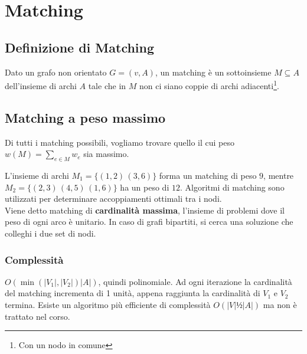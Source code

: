 \documentclass[../template]{subfiles}
\begin{document}
\section{Matching}
\subsection{Definizione di Matching}
Dato un grafo non orientato $G = (v, A)$, un matching è un sottoinsieme $M \subseteq A$ dell'insieme di archi $A$ tale che
in $M$ non ci siano coppie di archi adiacenti\footnote{Con un nodo in comune}.
\subsection{Matching a peso massimo}
Di tutti i matching possibili, vogliamo trovare quello il cui peso $w(M) = \sum_{e \in M} w_e$ sia massimo.

\begin{figure}[h]
    \centering
\end{figure}

\noindent L'insieme di archi $M_1 = \{ (1, 2) \, (3, 6)\}$ forma un matching di peso $9$, mentre $M_2 = \{(2, 3)\,(4, 5)\,(1, 6)\}$ ha un peso
di $12$.
Algoritmi di matching sono utilizzati per determinare accoppiamenti ottimali tra i nodi.
\\[10pt]
Viene detto matching di \textbf{cardinalità massima}, l'insieme di problemi dove il peso di ogni arco è unitario.
In caso di grafi bipartiti, si cerca una soluzione che colleghi i due set di nodi.


%
\subsubsection{Complessità}
$O(\min(|V_1|, |V_2|) |A|)$, quindi polinomiale. Ad ogni iterazione la cardinalità del matching incrementa di 1 unità, appena raggiunta la cardinalità
di $V_1$ e $V_2$ termina. Esiste un algoritmo più efficiente di complessità $O(|V|½|A|)$ ma non è trattato nel corso.
\end{document}
